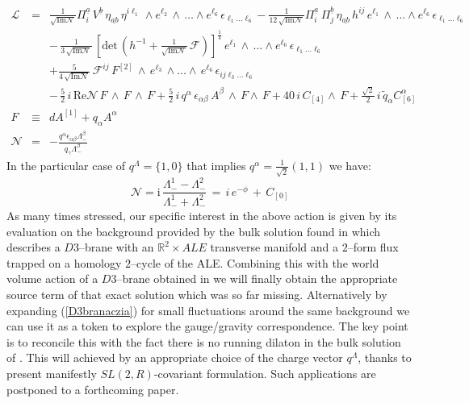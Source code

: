 \documentclass[a4paper,11pt]{article}
\def\tilde{\widetilde}
\begin{document}
\begin{eqnarray}
\mathcal{L} & = & \frac{1}{\sqrt{\mbox{Im}\mathcal{N}}}  \Pi^{\underline{a}} _i \, V^{\underline{b}} \,
\eta_{\underline{ab}}
 \, \eta^{i\ell_1} \, \wedge e^{\ell_2} \, \wedge \, \dots \wedge e^{\ell_6} \, \epsilon_{\ell_1 \dots
 \ell_6}  -  \frac{1}{12 \, \sqrt{\mbox{Im}\mathcal{N}}}  \Pi^{\underline{a}} _i \, \Pi^{\underline{b}}
_j \, \eta_{\underline{ab}} \, h^{ij} \, e^{\ell_1} \, \wedge \, \dots
\wedge e^{\ell_6} \, \epsilon_{\ell_1 \dots \ell_6} \nonumber\\
&& - \, \frac{1}{3 \, \sqrt{\mbox{Im}\mathcal{N}}} \, \left [ \mbox{det}\,\left(  h^{-1}
+ \frac{1}{\sqrt{\mbox{Im}\mathcal{N}}} \, \mathcal{F}\right) \right] ^{\frac{1}{4}} \,
  e^{\ell_1} \, \wedge \, \dots
\wedge e^{\ell_6} \, \epsilon_{\ell_1 \dots \ell_6}\nonumber\\
&& + \frac{5}{4 \, \sqrt{\mbox{Im}\mathcal{N}}} \, \mathcal{F}^{ij} \, F^{[2]} \,
\wedge \, e^{\ell_3} \,\wedge \dots  \wedge \,e^{\ell_6} \,
\epsilon_{ij\ell_3 \dots \ell_6} \nonumber \\
&& - \, \frac{5}{2} \, i \, \mbox{Re} \mathcal{N} \, F \, \wedge \, F \, \wedge \, F + \frac{5}{2} \, i
\,  q^{\alpha} \, \epsilon_{\alpha \beta} \, A^{\beta} \,
\wedge \, F \wedge \, F + 40 \, i \, C_{[4]} \wedge \, F + \frac{\sqrt{2}}{2} \, i \,
\tilde{q}_{\alpha} C_{[6]}^{\alpha} \nonumber \\
F & \equiv & dA^{[1]} + q_{\alpha} A^{\alpha}\nonumber\\
\mathcal{N} &=& - \frac{q^{\alpha} \epsilon_{\alpha \beta} \Lambda^{\beta}_{-}}
       { q_{\gamma} \Lambda^{\beta}_{-}}
\label{D3branaczia}
\end{eqnarray}
In the particular case of $q^\Lambda =\{1,0\}$ that implies $q^\alpha
= \frac{1}{\sqrt{2}}(1, 1)$ we have:
\begin{equation}
\mathcal{N} = \mbox{i}\,\frac{\Lambda^1_- - \Lambda^2_-}{\Lambda^1_- +
  \Lambda^2_-} \, = \, i \, e^{- \phi} \, + \, C_{[0]}
\end{equation}
As many times stressed, our specific interest in the above action is
given by its evaluation on the background provided
by the bulk solution found in \cite{noialtrilast} which describes a $D3$--brane with an
$\mathbb{R}^2 \times ALE$ transverse manifold and a $2$--form flux trapped on
a homology $2$--cycle of the ALE.  Combining this with the world volume action of
a $D3$--brane obtained in \cite{noidued3} we will finally obtain the appropriate
source term of that exact solution
which was so far missing. Alternatively by expanding (\ref{D3branaczia}) for small fluctuations around
the same background we can use it as a token to explore
the gauge/gravity correspondence. The key point is to reconcile this
with the fact there is no running dilaton  in the bulk  solution of
\cite{noidued3}. This will achieved by an appropriate choice of the
charge vector $q^\Lambda$, thanks to present manifestly
$SL(2,R)$-covariant formulation. Such applications are postponed to a
forthcoming paper.
\end{document}
